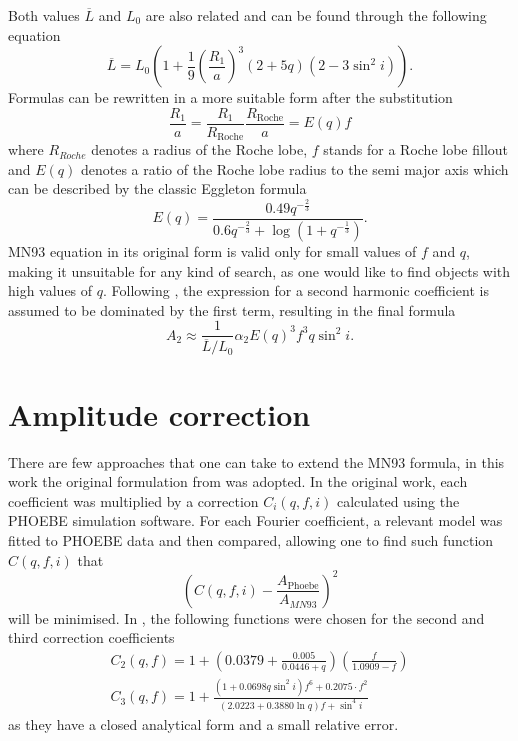 \documentclass{pracalicmgr}
\begin{document}
Both values $\overline{L}$ and $L_0$ are also related and can be found through the following equation
\begin{equation}
    \overline{L}=L_0\left(1+\frac{1}{9}\left(\frac{R_1}{a}\right)^3(2+5q)(2-3\sin^2{i})\right).
\end{equation}
Formulas can be rewritten in a more suitable form after the substitution
\begin{equation}
    \frac{R_1}{a}=\frac{R_1}{R_{\textrm{Roche}}}\frac{R_{\textrm{Roche}}}{a}=E(q)f
\end{equation}
where $R_{Roche}$ 
denotes a radius of the Roche lobe, $f$ stands for a Roche lobe fillout and $E(q)$ denotes a ratio of the Roche lobe radius to the semi major axis which can be described by the classic Eggleton formula 
\citep{eggleton_approximations_1983}
\begin{equation}
    E(q)=\frac{0.49q^{-\frac{2}{3}}}{0.6q^{-\frac{2}{3}}+\log{(1+q^{-\frac{1}{3}})}}.
\end{equation}
MN93 equation in its original form is valid only for small values of $f$ and $q$, making it unsuitable for any kind of search, as one would like to find objects with high values of $q$.
Following \citet{gomel_search_2021-1}, the expression for a second harmonic coefficient is assumed to be dominated by the first term, resulting in the final formula 
\begin{equation}
    A_2\approx \frac{1}{\overline{L}/L_0} \alpha_2 E(q)^3 f^3 q \sin^2{i}.
\end{equation}
\section{Amplitude correction}
There are few approaches that one can take to extend the MN93 formula, in this work the original formulation from \citet{gomel_search_2021-1} was adopted.
In the original work, each coefficient was multiplied by a correction $C_i(q,f,i)$ calculated using the PHOEBE simulation software. For each
Fourier coefficient, a relevant model was fitted to PHOEBE data and then compared, allowing one to find such function $C(q,f,i)$ that 
\begin{equation}
    \left(C(q,f,i)-\frac{A_{\textrm{Phoebe}}}{A_{MN93}}\right)^2
\end{equation}
will be minimised. In \citet{gomel_search_2021-1}, the following functions were chosen for the second and third correction coefficients
\begin{align}
    C_2(q,f)=1+\left(0.0379+\frac{0.005}{0.0446+q}\right)\left(\frac{f}{1.0909-f}\right)\\
    C_3(q,f)=1+\frac{(1+0.0698q\sin^2{i})f^6+0.2075\cdot f^2}{(2.0223+0.3880\ln{q})f+\sin^4{i}}
\end{align}
as they have a closed analytical form and a small relative error. 
\end{document}
